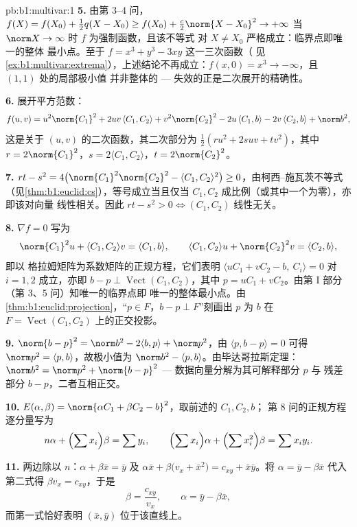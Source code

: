 \begin{solution}{pb:b1:multivar:1}
\textbf{5.} 由第 3--4 问，$f(X) = f(X_0) + \frac12 q(X -
X_0) \geq f(X_0) + \frac c2\norm{X - X_0}^2 \to +\infty$ 当
$\norm X \to \infty$ 时 $f$ 为强制函数，且该不等式
对 $X \neq X_0$ 严格成立：临界点即唯一的整体
最小点。至于 $f = x^3 + y^3 - 3xy$ 这一三次函数（
见\cref{ex:b1:multivar:extrema}），上述结论不再成立：$f(x,0)
= x^3 \to -\infty$，且 $(1,1)$ 处的局部极小值
并非整体的 --- 失效的正是二次展开的精确性。

\textbf{6.} 展开平方范数：
\[
f(u,v) = u^2\norm{C_1}^2 + 2uv\,\langle C_1, C_2\rangle +
v^2\norm{C_2}^2 - 2u\,\langle C_1, b\rangle - 2v\,\langle C_2,
b\rangle + \norm b^2 ,
\]
这是关于 $(u, v)$ 的二次函数，其二次部分为
$\frac12(ru^2 + 2suv + tv^2)$，其中 $r = 2\norm{C_1}^2$，$s =
2\langle C_1, C_2\rangle$，$t = 2\norm{C_2}^2$。

\textbf{7.} $rt - s^2 = 4\bigl(\norm{C_1}^2\norm{C_2}^2 -
\langle C_1, C_2\rangle^2\bigr) \geq 0$，由柯西–施瓦茨不等式
（见\cref{thm:b1:euclid:cs}），等号成立当且仅当 $C_1, C_2$
成比例（或其中一个为零），亦即该对向量
线性相关。因此 $rt - s^2 > 0 \iff (C_1, C_2)$ 线性无关。

\textbf{8.} $\nabla f = 0$ 写为
\[
\norm{C_1}^2 u + \langle C_1, C_2\rangle v = \langle C_1,
b\rangle,
\qquad
\langle C_1, C_2\rangle u + \norm{C_2}^2 v = \langle C_2,
b\rangle,
\]
即以 格拉姆矩阵为系数矩阵的正规方程，它们表明
$\langle uC_1 + vC_2 - b,\ C_i\rangle = 0$ 对 $i = 1, 2$ 成立，亦即
$b - p \perp \operatorname{Vect}(C_1, C_2)$，其中 $p = uC_1 +
vC_2$。由第 I 部分（第 3、5 问）知唯一的临界点即
唯一的整体最小点。由
\cref{thm:b1:euclid:projection}，“$p \in
F$，$b - p \perp F$”刻画出 $p$ 为
$b$ 在 $F = \operatorname{Vect}(C_1, C_2)$ 上的正交投影。

\textbf{9.} $\norm{b - p}^2 = \norm b^2 - 2\langle b, p\rangle +
\norm p^2$，由 $\langle p, b - p\rangle = 0$ 可得 $\norm p^2 =
\langle p, b\rangle$，故极小值为 $\norm b^2 - \langle p,
b\rangle$。由毕达哥拉斯定理：$\norm b^2 = \norm p^2 + \norm{b - p}^2$
--- 数据向量分解为其可解释部分 $p$ 与
残差部分 $b - p$，二者互相正交。

\textbf{10.} $E(\alpha, \beta) = \norm{\alpha C_1 + \beta C_2 -
b}^2$，取前述的 $C_1, C_2, b$；
第 8 问的正规方程逐分量写为
\[
n\alpha + \Bigl(\sum x_i\Bigr)\beta = \sum y_i,
\qquad
\Bigl(\sum x_i\Bigr)\alpha + \Bigl(\sum x_i^2\Bigr)\beta = \sum
x_i y_i .
\]

\textbf{11.} 两边除以 $n$：$\alpha + \beta\bar x = \bar y$
及 $\alpha\bar x + \beta\bigl(v_x + \bar x^2\bigr) = c_{xy} +
\bar x\bar y$。将 $\alpha = \bar y - \beta\bar x$ 代入
第二式得 $\beta v_x = c_{xy}$，于是
\[
\beta = \frac{c_{xy}}{v_x}, \qquad \alpha = \bar y - \beta\bar
x ,
\]
而第一式恰好表明 $(\bar x, \bar y)$
位于该直线上。


\end{solution}
